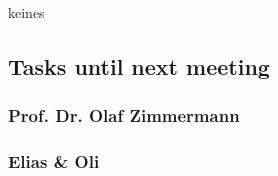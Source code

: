 keines

\hypertarget{tasks-until-next-meeting}{%
\subsection*{Tasks until next meeting}\label{tasks-until-next-meeting}}

\hypertarget{prof-dr-olaf-zimmermann}{%
\subsubsection*{Prof. Dr. Olaf
Zimmermann}\label{prof-dr-olaf-zimmermann}}

\hypertarget{elias--oli}{%
\subsubsection*{Elias \& Oli}\label{elias--oli}}